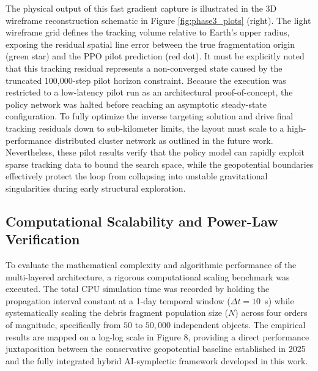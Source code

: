 \documentclass[letterpaper, preprint, 11pt]{AAS}
\begin{document}
The physical output of this fast gradient capture is illustrated in the 3D wireframe reconstruction schematic in Figure \ref{fig:phase3_plots} (right). The light wireframe grid defines the tracking volume relative to Earth's upper radius, exposing the residual spatial line error between the true fragmentation origin (green star) and the PPO pilot prediction (red dot). It must be explicitly noted that this tracking residual represents a non-converged state caused by the truncated 100,000-step pilot horizon constraint. Because the execution was restricted to a low-latency pilot run as an architectural proof-of-concept, the policy network was halted before reaching an asymptotic steady-state configuration. To fully optimize the inverse targeting solution and drive final tracking residuals down to sub-kilometer limits, the layout must scale to a high-performance distributed cluster network as outlined in the future work. Nevertheless, these pilot results verify that the policy model can rapidly exploit sparse tracking data to bound the search space, while the geopotential boundaries effectively protect the loop from collapsing into unstable gravitational singularities during early structural exploration.

\subsection{Computational Scalability and Power-Law Verification}
\label{subsec:scalability_analysis}

To evaluate the mathematical complexity and algorithmic performance of the multi-layered architecture, a rigorous computational scaling benchmark was executed. The total CPU simulation time was recorded by holding the propagation interval constant at a 1-day temporal window ($\Delta t = 10$~s) while systematically scaling the debris fragment population size ($N$) across four orders of magnitude, specifically from $50$ to $50,000$ independent objects. The empirical results are mapped on a log-log scale in Figure 8, providing a direct performance juxtaposition between the conservative geopotential baseline established in 2025~\cite{puerta-ibarra_advanced_2025} and the fully integrated hybrid AI-symplectic framework developed in this work.

\end{document}
